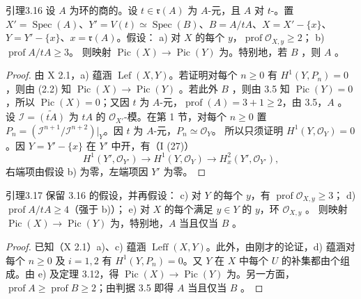 \begin{SGAresult}{引理}{3.16}
设 $A$ 为环的商的。设 $t\in\mathfrak r(A)$ 为 $A$-元，且 $A$ 对 $t$-。置 $X'=\operatorname{Spec}(A)$、$Y'=V(t)\simeq\operatorname{Spec}(B)$、$B=A/tA$、$X=X'-\{x\}$、$Y=Y'-\{x\}$、$x=\mathfrak r(A)$。假设：
a) 对 $X$ 的每个 $y$，$\operatorname{prof}\mathcal O_{X,y}\geq2$；
b) $\operatorname{prof}A/tA\geq3$。
则映射 $\operatorname{Pic}(X)\to\operatorname{Pic}(Y)$ 为。特别地，若 $B$ ，则 $A$ 。
\end{SGAresult}
\begin{proof}
由 X 2.1，a) 蕴涵 $\operatorname{Lef}(X,Y)$。若证明对每个 $n\geq0$ 有 $H^1(Y,P_n)=0$，则由 (2.2) 知 $\operatorname{Pic}(X)\to\operatorname{Pic}(Y)$ 。若此外 $B$ ，则由 3.5 知 $\operatorname{Pic}(Y)=0$，所以 $\operatorname{Pic}(X)=0$；又因 $t$ 为 $A$-元，$\operatorname{prof}(A)=3+1\geq2$，由 3.5，$A$ 。设 $\mathcal I=\widetilde{(tA)}$ 为 $tA$ 的 $\mathcal O_{X'}$-模。在第 1 节，对每个 $n\geq0$ 置 $P_n=(\mathcal I^{n+1}/\mathcal I^{n+2})|_Y$。因 $t$ 为 $A$-元，$P_n\simeq\mathcal O_Y$。
所以只须证明 $H^1(Y,\mathcal O_Y)=0$。因 $Y=Y'-\{x\}$ 在 $Y'$ 中开，有（I (27)）
\[H^1(Y',\mathcal O_{Y'})\longrightarrow H^1(Y,\mathcal O_Y)\longrightarrow H^2_x(Y',\mathcal O_{Y'}),\]
右端项由假设 b) 为零，左端项因 $Y'$ 为零。
\end{proof}
\begin{SGAresult}{引理}{3.17}
保留 3.16 的假设，并再假设：
c) 对 $Y$ 的每个 $y$，有 $\operatorname{prof}\mathcal O_{X,y}\geq3$；
d) $\operatorname{prof}A/tA\geq4$（强于 b)）；
e) 对 $X$ 的每个满足 $y\in Y$ 的 $y$，环 $\mathcal O_{X,y}$ 。
则映射 $\operatorname{Pic}(X)\to\operatorname{Pic}(Y)$ 为，特别地，$A$ 当且仅当 $B$ 。
\end{SGAresult}
\begin{proof}
已知（X 2.1）a)、c) 蕴涵 $\operatorname{Leff}(X,Y)$。此外，由刚才的论证，d) 蕴涵对每个 $n\geq0$ 及 $i=1,2$ 有 $H^1(Y,P_n)=0$。又 $Y$ 在 $X$ 中每个 $U$ 的补集都由个组成。由 e) 及定理 3.12，得 $\operatorname{Pic}(X)\to\operatorname{Pic}(Y)$ 为。另一方面，$\operatorname{prof}A\geq\operatorname{prof}B\geq2$；由判据 3.5 即得 $A$ 当且仅当 $B$ 。
\end{proof}
